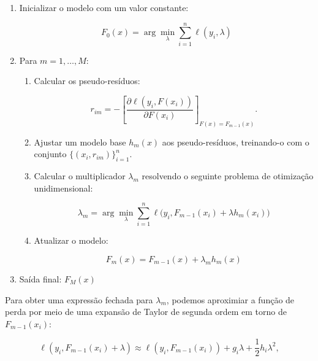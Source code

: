 \documentclass{article}
\begin{document}
\begin{enumerate}
    \item Inicializar o modelo com um valor constante:
    
    \begin{equation*}
        F_0(x) = \arg\min_{\lambda} \sum_{i=1}^{n} \ell(y_i,\lambda)
    \end{equation*}

    \item Para $m = 1, \dots, M$:

    \begin{enumerate}

    \item Calcular os pseudo-resíduos:

    \begin{equation*}
        r_{im} = -\left[\frac{\partial\ell(y_i,F(x_i))}{\partial F(x_i)}\right]_{F(x)=F_{m-1}(x)}.
    \end{equation*}

    \item Ajustar um modelo base $h_m(x)$ aos pseudo-resíduos, treinando-o
    com o conjunto $\{(x_i, r_{im})\}_{i=1}^{n}$.

    \item Calcular o multiplicador $\lambda_m$ resolvendo o seguinte 
    problema de otimização unidimensional:

    \begin{equation*}
        \lambda_m =\arg\min_{\lambda}\sum_{i=1}^{n}\ell\big(y_i, F_{m-1}(x_i) + \lambda h_m(x_i)\big)
    \end{equation*}

    \item Atualizar o modelo:

    \begin{equation*}
        F_m(x) = F_{m-1}(x) + \lambda_m h_m(x)
    \end{equation*}

    \end{enumerate}

    \item Saída final: $F_M(x)$
\end{enumerate}

Para obter uma expressão fechada para $\lambda_m$, podemos
aproximiar a função de perda por meio de uma expansão de 
Taylor de segunda ordem em torno de $F_{m - 1}(x_i)$:

\begin{equation*}
    \ell(y_i,F_{m-1}(x_i)+\lambda) \approx \ell(y_i,F_{m-1}(x_i)) + g_i\lambda + \frac{1}{2}h_i\lambda^2,
\end{equation*}
\end{document}
